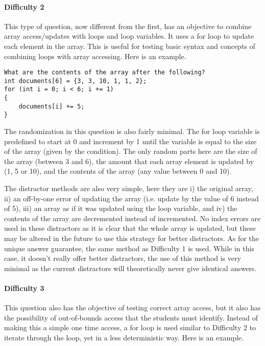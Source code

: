 \documentclass{article}
\begin{document}
\paragraph{Difficulty 2} \hfill \par

This type of question, now different from the first, has an objective to combine array access/updates with loops and loop variables. It uses a for loop to update each element in the array. This is
useful for testing basic syntax and concepts of combining loops with array accessing. Here is an example. 

\begin{lstlisting}
What are the contents of the array after the following?
int documents[6] = {3, 3, 10, 1, 1, 2};
for (int i = 0; i < 6; i += 1)
{ 
	documents[i] += 5; 
} 
\end{lstlisting}

The randomization in this question is also fairly minimal. The for loop variable is predefined to start at 0 and increment by 1 until the variable is equal to the size of the array (given by the 
condition). The only random parts here are the size of the array (between 3 and 6), the amount that each array element is updated by (1, 5 or 10), and the contents of the array (any value 
between 0 and 10). 

The distractor methods are also very simple, here they are i) the original array, ii) an off-by-one error of updating the array (i.e. update by the value of 6 instead of 5), iii) an array as if it was
updated using the loop variable, and iv) the contents of the array are decremented instead of incremented. No index errors are used in these distractors as it is clear that the whole array is 
updated, but these may be altered in the future to use this strategy for better distractors. As for the unique answer guarantee, the same method as Difficulty 1 is used. While in this case, it
doesn't really offer better distractors, the use of this method is very minimal as the current distractors will theoretically never give identical answers. 

\paragraph{Difficulty 3} \hfill \par

This question also has the objective of testing correct array access, but it also has the possibility of out-of-bounds access that the students must identify. Instead of making this a simple one time
access, a for loop is used similar to Difficulty 2 to iterate through the loop, yet in a less deterministic way. Here is an example.
\end{document}
